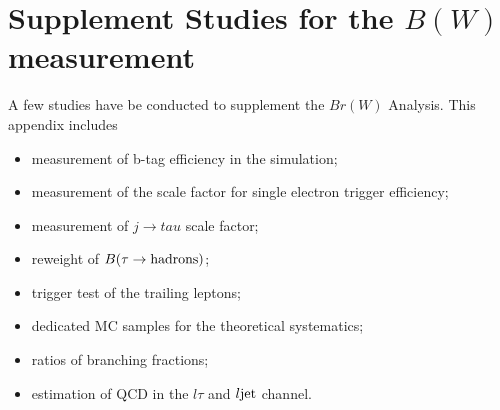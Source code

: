 \chapter{Supplement Studies for the $B(W)$ measurement}

A few studies have be conducted to supplement the $Br(W)$ Analysis. This appendix includes 
\begin{itemize}
    \item measurement of b-tag efficiency in the simulation;
    \item measurement of the scale factor for single electron trigger efficiency;
    \item measurement of $j \to tau$ scale factor;
    \item reweight of $B(\tau \to  \rm{hadrons})$;
    \item trigger test of the trailing leptons;
    \item dedicated MC samples for the \ttbar theoretical systematics;
    \item ratios of branching fractions;
    \item estimation of QCD in the $l\tau$ and $l\rm{jet}$ channel. 
\end{itemize}










